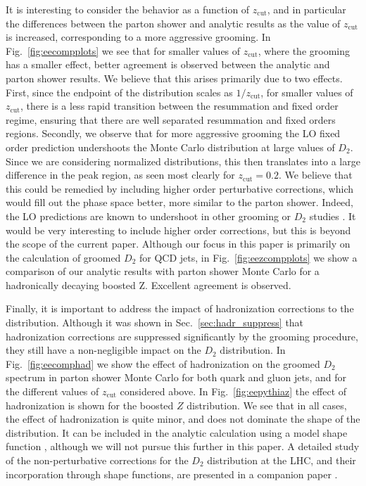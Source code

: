 \documentclass[a4paper,11pt]{article}
\def\zcut{z_{\text{cut}}}
\DeclareRobustCommand{\Sec}[1]{Sec.~\ref{#1}}
\DeclareRobustCommand{\Fig}[1]{Fig.~\ref{#1}}
\begin{document}
It is interesting to consider the behavior as a function of $\zcut$, and in particular the differences between the parton shower and analytic results as the value of $\zcut$ is increased, corresponding to a more aggressive grooming. In \Fig{fig:eecompplots} we see that for smaller values of $\zcut$, where the grooming has a smaller effect, better agreement is observed between the analytic and parton shower results. We believe that this arises primarily due to two effects. First, since the endpoint of the distribution scales as $1/\zcut$, for smaller values of $\zcut$, there is a less rapid transition between the resummation and fixed order regime, ensuring that there are well separated resummation and fixed orders regions. Secondly,  we observe that for more aggressive grooming the LO fixed order prediction undershoots the Monte Carlo distribution at large values of $D_2$. Since we are considering normalized distributions, this then translates into a large difference in the peak region, as seen most clearly for $\zcut=0.2$. We believe that this could be remedied by including higher order perturbative corrections, which would fill out the phase space better, more similar to the parton shower. Indeed, the LO predictions are known to undershoot in other grooming or $D_2$ studies \cite{Larkoski:2015uaa,Dasgupta:2015lxh,Frye:2016aiz,Marzani:2017mva,CMS:2017tdn}. It would be very interesting to include higher order corrections, but this is beyond the scope of the current paper.  Although our focus in this paper is primarily on the calculation of groomed $D_2$ for QCD jets, in \Fig{fig:eezcompplots} we show a comparison of our analytic results with parton shower Monte Carlo for a hadronically decaying boosted Z. Excellent agreement is observed. 



Finally, it is important to address the impact of hadronization corrections to the distribution. Although it was shown in \Sec{sec:hadr_suppress} that hadronization corrections are suppressed significantly by the grooming procedure, they still have a non-negligible impact on the $D_2$ distribution. In \Fig{fig:eecomphad} we show the effect of hadronization on the groomed $D_2$ spectrum in parton shower Monte Carlo for both quark and gluon jets, and for the different values of $\zcut$ considered above. In \Fig{fig:eepythiaz} the effect of hadronization is shown for the boosted $Z$ distribution. We see that in all cases, the effect of hadronization is quite minor, and does not dominate the shape of the distribution. It can be included in the analytic calculation using a model shape function \cite{Korchemsky:1999kt,Korchemsky:2000kp,Bosch:2004th,Hoang:2007vb,Ligeti:2008ac}, although we will not pursue this further in this paper. A detailed study of the non-perturbative corrections for the $D_2$ distribution at the LHC, and their incorporation through shape functions, are presented in a companion paper \cite{Larkoski:2017iuy}. 
\end{document}
